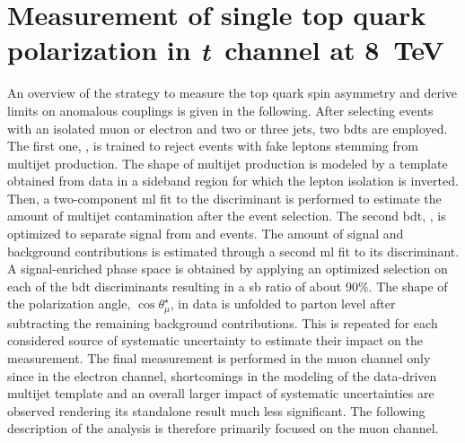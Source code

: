 \chapter{Measurement of single top quark polarization in \textsl{t}~channel at 8~TeV}



An overview of the strategy to measure the top quark spin asymmetry and derive limits on anomalous couplings is given in the following. After selecting events with an isolated muon or electron and two or three jets, two \glspl{bdt} are employed. The first one, \bdtqcd, is trained to reject events with fake leptons stemming from multijet production. The shape of multijet production is modeled by a template obtained from data in a sideband region for which the lepton isolation is inverted. Then, a two-component \gls{ml} fit to the \bdtqcd discriminant is performed to estimate the amount of multijet contamination after the event selection. The second \gls{bdt}, \bdttch, is optimized to separate signal from \wjets and \ttbar events. The amount of signal and background contributions is estimated through a second \gls{ml} fit to its discriminant. A signal-enriched phase space is obtained by applying an optimized selection on each of the \gls{bdt} discriminants resulting in a \gls{sb} ratio of about 90\%. The shape of the polarization angle, $\cos\theta^\star_{\mu}$, in data is unfolded to parton level after subtracting the remaining background contributions. This is repeated for each considered source of systematic uncertainty to estimate their impact on the measurement. The final measurement is performed in the muon channel only since in the electron channel, shortcomings in the modeling of the data-driven multijet template and an overall larger impact of systematic uncertainties are observed rendering its standalone result much less significant. The following description of the analysis is therefore primarily focused on the muon channel. 


